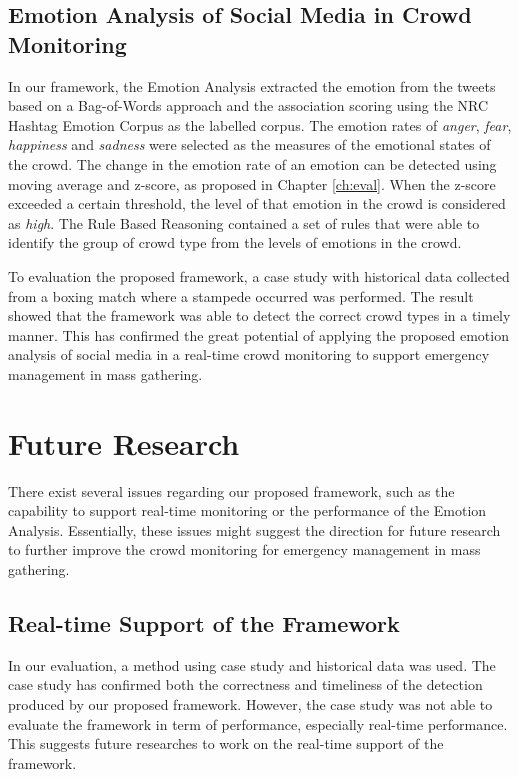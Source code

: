 \subsection{Emotion Analysis of Social Media in Crowd Monitoring}
In our framework, the Emotion Analysis extracted the emotion from the tweets based on a Bag-of-Words approach and the association scoring using the NRC Hashtag Emotion Corpus \citep{mohammad2014using} as the labelled corpus. The emotion rates of \textit{anger}, \textit{fear}, \textit{happiness} and \textit{sadness} were selected as the measures of the emotional states of the crowd. The change in the emotion rate of an emotion can be detected using moving average and z-score, as proposed in Chapter \ref{ch:eval}. When the z-score exceeded a certain threshold, the level of that emotion in the crowd is considered as \textit{high}. The Rule Based Reasoning contained a set of rules that were able to identify the group of crowd type from the levels of emotions in the crowd. 

To evaluation the proposed framework, a case study with historical data collected from a boxing match where a stampede occurred was performed. The result showed that the framework was able to detect the correct crowd types in a timely manner. This has confirmed the great potential of applying the proposed emotion analysis of social media in a real-time crowd monitoring to support emergency management in mass gathering.

\section{Future Research}
There exist several issues regarding our proposed framework, such as the capability to support real-time monitoring or the performance of the Emotion Analysis. Essentially, these issues might suggest the direction for future research to further improve the crowd monitoring for emergency management in mass gathering.

\subsection{Real-time Support of the Framework}
In our evaluation, a method using case study and historical data was used. The case study has confirmed both the correctness and timeliness of the detection produced by our proposed framework. However, the case study was not able to evaluate the framework in term of performance, especially real-time performance. This suggests future researches to work on the real-time support of the framework.

